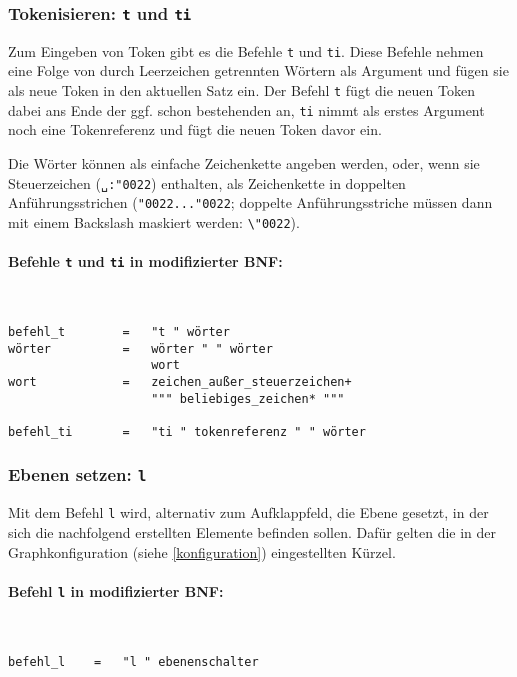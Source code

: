 \documentclass[12pt]{scrartcl}
\newcommand{\quo}{\char"0022}
\begin{document}
\subsubsection{Tokenisieren: \texttt{t} und \texttt{ti}}

Zum Eingeben von Token gibt es die Befehle \texttt{t} und \texttt{ti}. Diese Befehle nehmen eine Folge von durch Leerzeichen getrennten Wörtern als Argument und fügen sie als neue Token in den aktuellen Satz ein. Der Befehl \texttt{t} fügt die neuen Token dabei ans Ende der ggf. schon bestehenden an, \texttt{ti} nimmt als erstes Argument noch eine Tokenreferenz und fügt die neuen Token davor ein.

Die Wörter können als einfache Zeichenkette angeben werden, oder, wenn sie Steuerzeichen (\texttt{␣:\quo}) enthalten, als Zeichenkette in doppelten Anführungsstrichen (\texttt{\quo...\quo}; doppelte Anführungsstriche müssen dann mit einem Backslash maskiert werden: \texttt{\textbackslash\quo}).

\paragraph*{Befehle \texttt{t} und \texttt{ti} in modifizierter BNF:}
~
\begin{framed}
\begin{lstlisting}
befehl_t        =   "t " wörter
wörter          =   wörter " " wörter
                    wort
wort            =   zeichen_außer_steuerzeichen+
                    """ beliebiges_zeichen* """

befehl_ti       =   "ti " tokenreferenz " " wörter
\end{lstlisting}
\end{framed}


\subsubsection{Ebenen setzen: \texttt{l}}\label{l}

Mit dem Befehl \texttt{l} wird, alternativ zum Aufklappfeld, die Ebene gesetzt, in der sich die nachfolgend erstellten Elemente befinden sollen. Dafür gelten die in der Graphkonfiguration (siehe \ref{konfiguration}) eingestellten Kürzel.

\paragraph*{Befehl \texttt{l} in modifizierter BNF:}
~
\begin{framed}
\begin{lstlisting}
befehl_l    =   "l " ebenenschalter
\end{lstlisting}
\end{framed}
\end{document}
